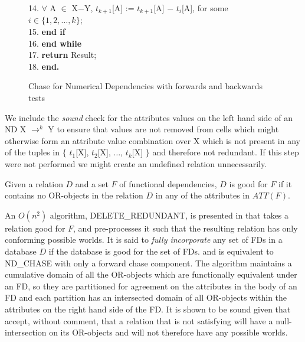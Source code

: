 {\begin{figure}[ht]
{\begin{minipage}{14cm}
\begin{algorithm}[{\rm ND\_CHASE}($r$, {\rm N})]
\begin{rm}
\begin{tabbing}
14. \> \> \> \> \>  $\forall$ A $\in$ X$-$Y,  $t_{k+1}$[A] := $t_{k+1}$[A] $-$ $t_i$[A], for some $i \in \{1,2,\ldots,k\}$; \\
15. \> \> \> \> {\bf end if}\\
16.  \> \> \> {\bf end while} \\
17. \> \> \> {\bf return} Result;  \\
18. \> \> {\bf end.}
\end{tabbing}
\end{rm}
\end{algorithm}
\end{minipage}}
\caption{\label{cp:fig:indef_chase} Chase for Numerical Dependencies with forwards and backwards tests}
\end{figure}
}

We include the {\em sound} check for the attributes values on the left
hand side of an ND X $\to^k$ Y to ensure that values are not removed
from cells which might otherwise form an attribute value combination over X
which is not present in any of the tuples in $\{$ $t_1$[X], $t_2$[X],
$\ldots$, $t_k$[X] $\}$ and therefore not redundant. If this step were
not performed we might 
create an undefined relation unnecessarily. 

\medskip
\begin{definition}\label{cp:def_good}
\begin{rm}
Given a relation $D$ and a set $F$ of functional dependencies,
$D$ is good for $F$ if it contains no OR-objects in the
relation $D$ in any of the attributes in $ATT(F)$.
\end{rm}
\end{definition}

An $O(n^2)$ algorithm, DELETE\_REDUNDANT, is presented in \cite{vn95} that takes a relation good for $F$, and
pre-processes it such that the resulting relation has only conforming
possible worlds.  It is said to {\em fully incorporate} any set of FDs in
a database $D$ if the database is good for the set of FDs. and is
equivalent to ND\_CHASE with 
only a forward chase component. The algorithm maintains a cumulative domain of all the OR-objects which
are functionally equivalent under an FD, so they are partitioned for
agreement on the attributes in the body of an FD and each partition
has an intersected domain of all OR-objects within the attributes
on the right hand side of the FD. It is shown to be
sound given that \cite{vn95} accept, without comment, that a
relation that is not satisfying will have a null-intersection on its
OR-objects and will not therefore have any possible worlds.\\


